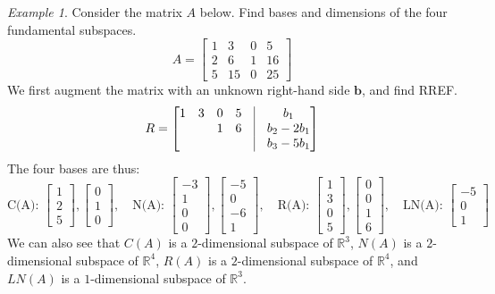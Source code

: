\documentclass[11pt,oneside]{amsbook}
\newcommand{\R}{\mathbb R}
\theoremstyle{definition}
\theoremstyle{plain}
\theoremstyle{definition}
\theoremstyle{remark}
\newtheorem{example}[theorem]{Example}
\numberwithin{equation}{section}
\numberwithin{figure}{section}
\begin{document}
\begin{example}
  Consider the matrix $A$ below. Find bases and dimensions of the four fundamental subspaces.
  \[A=\begin{bmatrix}
      1&3&0&5\\2&6&1&16\\5&15&0&25
    \end{bmatrix}
  \]
  We first augment the matrix with an unknown right-hand side $\bm{b}$, and find RREF.
  \[R=\begin{bmatrix}
    1&3&0&5&\vline&b_1\\
    &&1&6&\vline&b_2-2b_1\\
    &&&&\vline&b_3-5b_1
    \end{bmatrix}
  \]
  The four bases are thus:
  \[\text{C(A): }\begin{bmatrix}1\\2\\5\end{bmatrix},
    \begin{bmatrix}0\\1\\0\end{bmatrix},\quad
    \text{N(A): }\begin{bmatrix}-3\\1\\0\\0\end{bmatrix},
    \begin{bmatrix}-5\\0\\-6\\1\end{bmatrix},\quad
    \text{R(A): }\begin{bmatrix}1\\3\\0\\5\end{bmatrix},
    \begin{bmatrix}0\\0\\1\\6\end{bmatrix},\quad
    \text{LN(A): }\begin{bmatrix}-5\\0\\1\end{bmatrix}
  \]
  We can also see that $C(A)$ is a $2$-dimensional subspace of $\R^3$, $N(A)$ is a $2$-dimensional subspace of $\R^4$, $R(A)$ is a $2$-dimensional subspace of $\R^4$, and $LN(A)$ is a $1$-dimensional subspace of $\R^3$.
\end{example}
\end{document}
